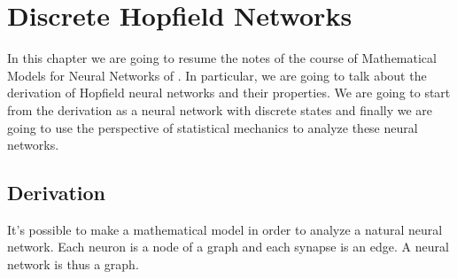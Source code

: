 \chapter{Discrete Hopfield Networks}
\label{ch:DHopfield}

In this chapter we are going to resume the notes of the course of Mathematical Models for Neural Networks of \citet{MMNN}. In particular, we are going to talk about the derivation of Hopfield neural networks and their properties. We are going to start from the derivation as a neural network with discrete states and finally we are going to use the perspective of statistical mechanics to analyze these neural networks.

\section{Derivation}

It's possible to make a mathematical model in order to analyze a natural neural network. Each neuron is a node of a graph and each synapse is an edge. A neural network is thus a graph.


